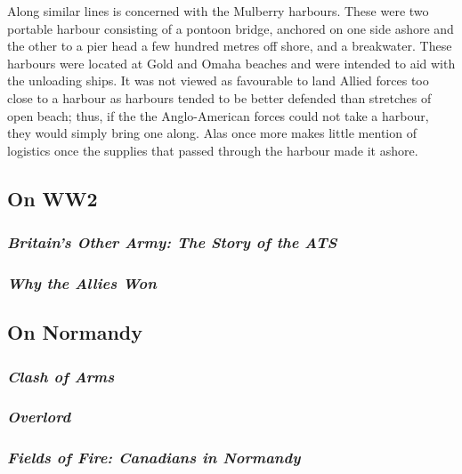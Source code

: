 \documentclass[noraggedright]{turabian-researchpaper}
\begin{document}
Along similar lines %
is concerned with the Mulberry harbours.  These were two portable harbour 
consisting of a pontoon bridge, anchored on one side ashore and the other
to a pier head a few hundred metres off shore, and a breakwater.  These
harbours were located at Gold and Omaha beaches and were intended to aid
with the unloading ships.  It was not viewed as favourable to land Allied
forces too close to a harbour as harbours tended to be better defended 
than stretches of open beach; thus, if the the Anglo-American forces could
not take a harbour, they would simply bring one along.  Alas %
once more makes little mention of logistics once the supplies that passed
through the harbour made it ashore.

	\subsection{On WW2} %
		\subsubsection{\textit{Britain's Other Army:  The Story of
			the ATS}}
		\subsubsection{\textit{Why the Allies Won}}

	\subsection{On Normandy}


		\subsubsection{\textit{Clash of Arms}}
		\subsubsection{\textit{Overlord}}
		\subsubsection{\textit{Fields of Fire:  Canadians in 
			Normandy}}
\end{document}
